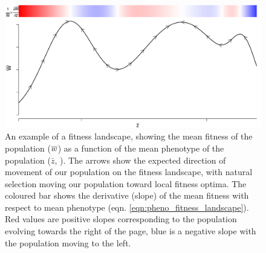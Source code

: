  \begin{figure}
 \begin{center}
 \includegraphics[width= 0.8 \textwidth]{figures/Response_to_sel/fitness_landscape_1D.pdf}
 \end{center}
 \caption{An example of a fitness landscape, showing the mean fitness
   of the population ($\overline{w}$) as a function of the mean phenotype of the
   population ($\bar{z}$, ). The arrows show the expected direction of movement
of our population on the fitness landscape, with natural selection moving
our population toward local fitness optima. The coloured bar shows the
derivative (slope) of the mean fitness with respect to mean
phenotype (eqn. \eqref{eqn:pheno_fitness_landscape}). Red values are positive slopes corresponding to the population evolving
towards the right of the page, blue is a negative slope with the
population moving to the left. } \label{fig:fitness_landscape_1D}  
\end{figure}

